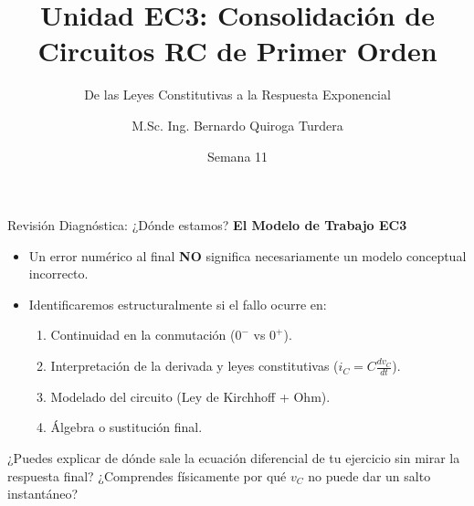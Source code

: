 \documentclass[aspectratio=169, 10pt]{beamer}
\title[Consolidación RC]{Unidad EC3: Consolidación de Circuitos RC de Primer Orden}
\subtitle{De las Leyes Constitutivas a la Respuesta Exponencial}
\author[B. Quiroga Turdera]{M.Sc. Ing. Bernardo Quiroga Turdera}
\institute[UCB Tarija]{Universidad Católica Boliviana ``San Pablo'' --- Sede Tarija}
\date{Semana 11}
\begin{document}
\begin{frame}
    \titlepage
\end{frame}

\begin{frame}{Revisión Diagnóstica: ¿Dónde estamos?}
    \textbf{El Modelo de Trabajo EC3}
    \begin{itemize}
        \item Un error numérico al final \textbf{NO} significa necesariamente un modelo conceptual incorrecto.
        \item Identificaremos estructuralmente si el fallo ocurre en:
        \begin{enumerate}
            \item Continuidad en la conmutación ($0^-$ vs $0^+$).
            \item Interpretación de la derivada y leyes constitutivas ($i_C = C \frac{dv_C}{dt}$).
            \item Modelado del circuito (Ley de Kirchhoff + Ohm).
            \item Álgebra o sustitución final.
        \end{enumerate}
    \end{itemize}
    \vspace{0.4cm}
    \begin{tcolorbox}[colback=white, colframe=ucbblue, title=Reflexión sobre Ejercicios Asignados]
        ¿Puedes explicar de dónde sale la ecuación diferencial de tu ejercicio sin mirar la respuesta final? ¿Comprendes físicamente por qué $v_C$ no puede dar un salto instantáneo?
    \end{tcolorbox}
\end{frame}
\end{document}
